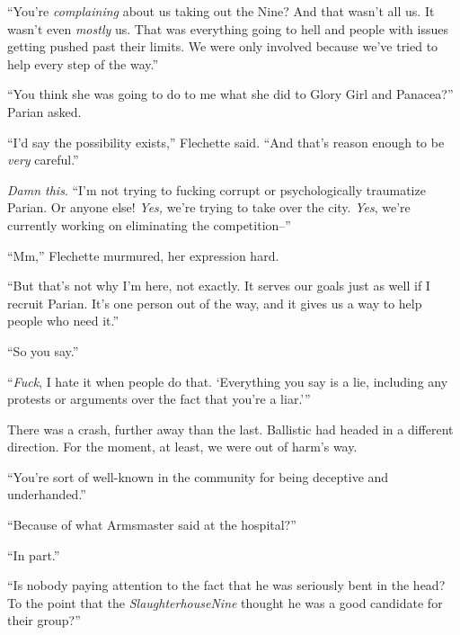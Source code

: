 ``You're \emph{complaining} about us taking out the Nine?  And that wasn't all us.  It wasn't even \emph{mostly} us.  That was everything going to hell and people with issues getting pushed past their limits.  We were only involved because we've tried to help every step of the way.''



``You think she was going to do to me what she did to Glory Girl and Panacea?'' Parian asked.



``I'd say the possibility exists,'' Flechette said. ``And that's reason enough to be \emph{very} careful.''



\emph{Damn this}.  ``I'm not trying to fucking corrupt or psychologically traumatize Parian.  Or anyone else!  \emph{Yes, }we're trying to take over the city.  \emph{Yes}, we're currently working on eliminating the competition--''



``Mm,'' Flechette murmured, her expression hard.



``But that's not why I'm here, not exactly.  It serves our goals just as well if I recruit Parian.  It's one person out of the way, and it gives us a way to help people who need it.''



``So you say.''



``\emph{Fuck}, I hate it when people do that.  `Everything you say is a lie, including any protests or arguments over the fact that you're a liar.'''



There was a crash, further away than the last.  Ballistic had headed in a different direction.  For the moment, at least, we were out of harm's way.



``You're sort of well-known in the community for being deceptive and underhanded.''



``Because of what Armsmaster said at the hospital?''



``In part.''



``Is nobody paying attention to the fact that he was seriously bent in the head?  To the point that the \emph{Slaughterhouse}\emph{Nine} thought he was a good candidate for their group?''



